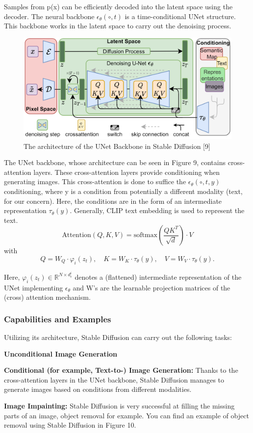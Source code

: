 \documentclass{article}
\begin{document}
Samples from p(x) can be efficiently decoded into the latent space using the decoder. The neural backbone $\epsilon_{\theta}(\circ, t)$ is a time-conditional UNet structure. This backbone works in the latent space to carry out the denoising process. \\

\begin{figure}
    \centering
    \includegraphics[width=0.75\linewidth]{sd_unet_backbone.png}
    \caption{The architecture of the UNet Backbone in Stable Diffusion [9]}
    \label{fig:enter-label}
\end{figure}

The UNet backbone, whose architecture can be seen in Figure 9, contains cross-attention layers. These cross-attention layers provide conditioning when generating images. This cross-attention is done to suffice the $\epsilon_{\theta}(\circ, t, y)$ conditioning, where y is a condition from potentially a different modality (text, for our concern). Here, the conditions are in the form of an intermediate representation $\tau_\theta(y)$. Generally, CLIP text embedding is used to represent the text.\\


\[\text{Attention}(Q, K, V) = \text{softmax} \left( \frac{QK^T}{\sqrt{d}} \right) \cdot V\]
with
\[Q = W_Q \cdot \varphi_i(z_t), \quad K = W_K \cdot \tau_\theta(y), \quad V = W_V \cdot \tau_\theta(y).\]

Here, \(\varphi_i(z_t) \in \mathbb{R}^{N \times d_\epsilon^i}\) denotes a (flattened) intermediate representation of the UNet implementing \(\epsilon_\theta\) and W's are the learnable projection matrices of the (cross) attention mechanism.


\subsubsection{Capabilities and Examples}
Utilizing its architecture, Stable Diffusion can carry out the following tasks:
\item \textbf{Unconditional Image Generation} \\
\item \textbf{Conditional (for example, Text-to-) Image Generation:} Thanks to the cross-attention layers in the UNet backbone, Stable Diffusion manages to generate images based on conditions from different modalities. \\
\item \textbf{Image Impainting:} Stable Diffusion is very successful at filling the missing parts of an image, object removal for example. You can find an example of object removal using Stable Diffusion in Figure 10. \\
\end{document}
